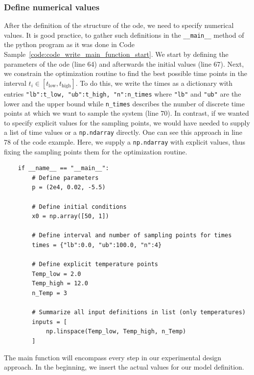 \documentclass[graybox]{svmult}
\begin{document}
\subsubsection*{Define numerical values}
After the definition of the structure of the \ac{ode}, we need to specify numerical values.
It is good practice, to gather such definitions in the \texttt{__main__} method of the python program as it was done in Code Sample~\ref{code:code_write_main_function_start}.
We start by defining the parameters of the \ac{ode} (line 64) and afterwards the initial values (line 67).
Next, we constrain the optimization routine to find the best possible time points in the interval $t_i\in\left[t_\text{low},t_\text{high}\right]$.
To do this, we write the times as a dictionary with entries \texttt{{"lb":t_low, "ub":t_high, "n":n_times}} where \texttt{"lb"} and \texttt{"ub"} are the lower and the upper bound while \texttt{n_times} describes the number of discrete time points at which we want to sample the system (line 70).
In contrast, if we wanted to specify explicit values for the sampling points, we would have needed to supply a list of time values or a \texttt{np.ndarray} directly.
One can see this approach  in line 78 of the code example.
Here, we supply a \texttt{np.ndarray} with explicit values, thus fixing the sampling points them for the optimization routine.
\begin{code}[h]
    \begin{verbatim}
    if __name__ == "__main__":
        # Define parameters
        p = (2e4, 0.02, -5.5)

        # Define initial conditions
        x0 = np.array([50, 1])

        # Define interval and number of sampling points for times
        times = {"lb":0.0, "ub":100.0, "n":4}

        # Define explicit temperature points
        Temp_low = 2.0
        Temp_high = 12.0
        n_Temp = 3

        # Summarize all input definitions in list (only temperatures)
        inputs = [
            np.linspace(Temp_low, Temp_high, n_Temp)
        ]
    \end{verbatim}
    \caption{
        The main function will encompass every step in our experimental design approach.
        In the beginning, we insert the actual values for our model definition.
    }
    \label{code:code_write_main_function_start}
\end{code}
\end{document}
